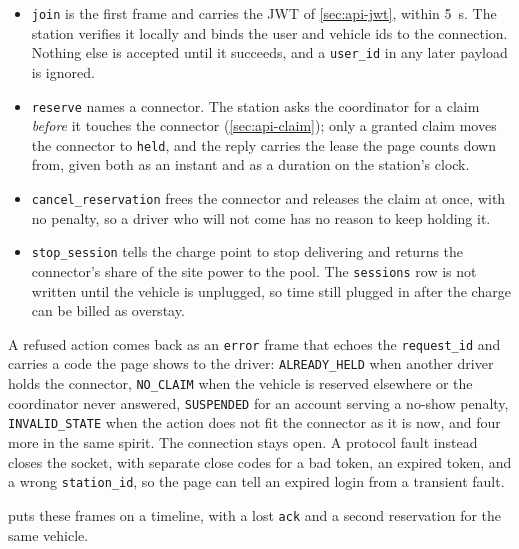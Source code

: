 \begin{itemize}
  \item \texttt{join} is the first frame and carries the JWT of \cref{sec:api-jwt}, within
        5~s. The station verifies it locally and binds the user and vehicle ids to the
        connection. Nothing else is accepted until it succeeds, and a \texttt{user\_id} in
        any later payload is ignored.
  \item \texttt{reserve} names a connector. The station asks the coordinator for a claim
        \emph{before} it touches the connector (\cref{sec:api-claim}); only a granted claim
        moves the connector to \texttt{held}, and the reply carries the lease the page
        counts down from, given both as an instant and as a duration on the station's clock.
  \item \texttt{cancel\_reservation} frees the connector and releases the claim at once,
        with no penalty, so a driver who will not come has no reason to keep holding it.
  \item \texttt{stop\_session} tells the charge point to stop delivering and returns the
        connector's share of the site power to the pool. The \texttt{sessions} row is not
        written until the vehicle is unplugged, so time still plugged in after the charge
        can be billed as overstay.
\end{itemize}

A refused action comes back as an \texttt{error} frame that echoes the \texttt{request\_id}
and carries a code the page shows to the driver: \texttt{ALREADY\_HELD} when another driver
holds the connector, \texttt{NO\_CLAIM} when the vehicle is reserved elsewhere or the
coordinator never answered, \texttt{SUSPENDED} for an account serving a no-show penalty,
\texttt{INVALID\_STATE} when the action does not fit the connector as it is now, and four
more in the same spirit. The connection stays open. A protocol fault instead closes the
socket, with separate close codes for a bad token, an expired token, and a wrong
\texttt{station\_id}, so the page can tell an expired login from a transient fault.

 puts these frames on a timeline, with a lost \texttt{ack} and a
second reservation for the same vehicle.

